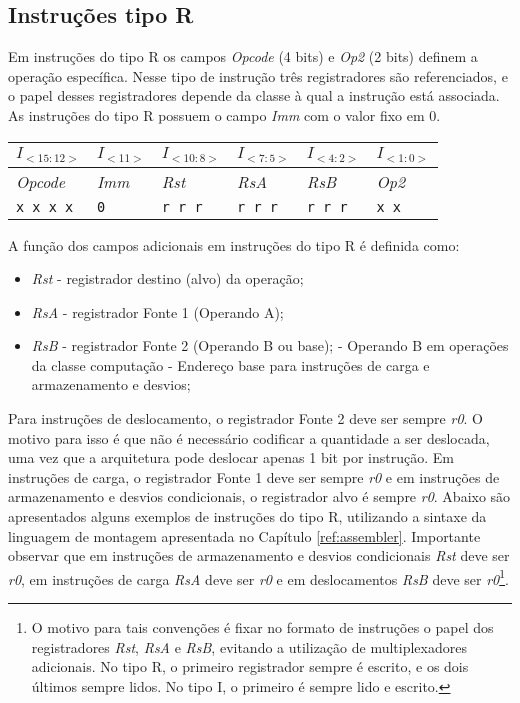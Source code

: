 \documentclass{extreport}
\begin{document}
\subsection{Instruções tipo R}
Em instruções do tipo R os campos \textit{Opcode} (4 bits) e \textit{Op2} (2 bits) definem a operação específica. Nesse tipo de instrução três registradores são referenciados, e o papel desses registradores depende da classe à qual a instrução está associada. As instruções do tipo R possuem o campo \textit{Imm} com o valor fixo em 0.

\begin{table}[ht!]
\centering
\begin{tabular}{|p{1.6cm}|p{1.6cm}|p{1.6cm}|p{1.6cm}|p{1.6cm}|p{1.6cm}|}
\hline
$I_{<15:12>}$ & $I_{<11>}$ & $I_{<10:8>}$ & $I_{<7:5>}$ & $I_{<4:2>}$ & $I_{<1:0>}$ \\ \hline
\textit{Opcode} & \textit{Imm} & \textit{Rst} & \textit{RsA} & \textit{RsB} & \textit{Op2} \\ \hline
\texttt{x x x x} & \texttt{0} & \texttt{r r r} & \texttt{r r r} & \texttt{r r r} & \texttt{x x} \\ \hline
\end{tabular}
\end{table}

A função dos campos adicionais em instruções do tipo R é definida como:

\begin{itemize}
\item \textit{Rst} - registrador destino (alvo) da operação;
\item \textit{RsA} - registrador Fonte 1 (Operando A);
\item \textit{RsB} - registrador Fonte 2 (Operando B ou base);
\subitem - Operando B em operações da classe computação
\subitem - Endereço base para instruções de carga e armazenamento e desvios;
\end{itemize}

Para instruções de deslocamento, o registrador Fonte 2 deve ser sempre \textit{r0}. O motivo para isso é que não é necessário codificar a quantidade a ser deslocada, uma vez que a arquitetura pode deslocar apenas 1 bit por instrução. Em instruções de carga, o registrador Fonte 1 deve ser sempre \textit{r0} e em instruções de armazenamento e desvios condicionais, o registrador alvo é sempre \textit{r0}.  Abaixo são apresentados alguns exemplos de instruções do tipo R, utilizando a sintaxe da linguagem de montagem apresentada no Capítulo \ref{ref:assembler}. Importante observar que em instruções de armazenamento e desvios condicionais \textit{Rst} deve ser \textit{r0}, em instruções de carga \textit{RsA} deve ser \textit{r0} e em deslocamentos \textit{RsB} deve ser \textit{r0}\footnote{O motivo para tais convenções é fixar no formato de instruções o papel dos registradores \textit{Rst}, \textit{RsA} e \textit{RsB}, evitando a utilização de multiplexadores adicionais. No tipo R, o primeiro registrador sempre é escrito, e os dois últimos sempre lidos. No tipo I, o primeiro é sempre lido e escrito.}.
\end{document}
